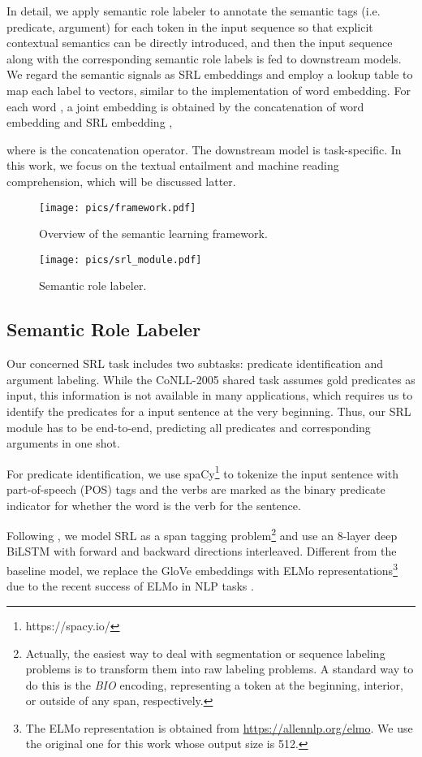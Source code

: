\documentclass[11pt]{article}
\begin{document}
In detail, we apply semantic role labeler to annotate the semantic tags (i.e. predicate, argument) for each token in the input sequence so that explicit contextual semantics can be directly introduced, and then the input sequence along with the corresponding semantic role labels is fed to downstream models. We regard the semantic signals as SRL embeddings and employ a lookup table to map each label to vectors, similar to the implementation of word embedding. For each word , a joint embedding  is obtained by the concatenation of word embedding  and SRL embedding ,

where  is the concatenation operator.
The downstream model is task-specific. In this work, we focus on the textual entailment and machine reading comprehension, which will be discussed latter.

\begin{figure}
	\centering
	\texttt{[image: pics/framework.pdf]}
	\caption{\label{fig:framework}Overview of the semantic learning framework.}
\end{figure}


\begin{figure*}
	\centering
	\texttt{[image: pics/srl\_module.pdf]}
	\caption{\label{fig:srl_module}Semantic role labeler.}
\end{figure*}

\subsection{Semantic Role Labeler}
Our concerned SRL task includes two subtasks: predicate identification and argument labeling. While the CoNLL-2005 shared task assumes gold predicates as input, this information is not available in many applications, which requires us to identify the predicates for a input sentence at the very beginning. Thus, our SRL module has to be end-to-end, predicting all predicates and corresponding arguments in one shot.

For predicate identification, we use spaCy\footnote{https://spacy.io/} to tokenize the input sentence with part-of-speech (POS) tags and the verbs are marked as the binary predicate indicator for whether the word is the verb for the sentence.

Following \citep{He2017Deep}, we model SRL as a span tagging problem\footnote{Actually, the easiest way to deal with segmentation or sequence labeling problems is to transform them into raw labeling problems. A standard way to do this is the \emph{BIO} encoding, representing a token at the beginning, interior, or outside of any span, respectively.} and use an 8-layer deep BiLSTM with forward and backward directions interleaved. Different from the baseline model, we replace the GloVe embeddings with ELMo representations\footnote{The ELMo representation is obtained from \url{https://allennlp.org/elmo}. We use the original one for this work whose output size is 512.} due to the recent success of ELMo in NLP tasks \citep{Peters2018ELMO}. 
\end{document}
